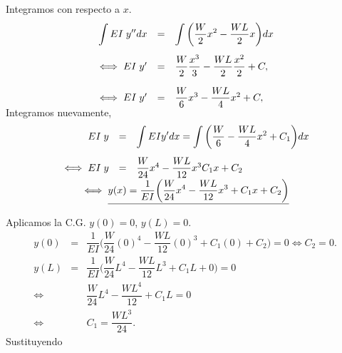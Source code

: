 \documentclass{beamer}
\begin{document}
\begin{frame}[t]
	\vspace{-3mm}
	\begin{exampleblock}{}
		Integramos con respecto a \(x\). \vspace{-3mm}
		\newcommand{\dis}{\displaystyle} %
		\[
			\begin{array}{rcl}
				\dis\int EI\;y'' dx & = & \dis\int \bigg(\dfrac{W}{2} x^2- \dfrac{WL}{2} x\bigg) dx \\[5mm]
				\iff EI\;y' & = & \dfrac{W}{2} \dfrac{x^3}{3} - \dfrac{WL}{2} \dfrac{x^2}{2} +C, \\[5mm]
				\iff EI\;y' & = & \dfrac{W}{6} x^3- \dfrac{WL}{4} x^2+C, \vspace{-3mm}
			\end{array}
		\]
		Integramos nuevamente, \vspace{-3mm}
		\[
			\begin{array}{rcl}
				EI\;y & = & \dis\int EIy' dx = \dis\int \bigg(\dfrac{W}{6} - \dfrac{WL}{4} x^2+C_1\bigg) dx \\[5mm]
				\iff EI\;y & = & \dfrac{W}{24} x^4 - \dfrac{WL}{12} x^3C_1x+C_2 \vspace{-2mm}
			\end{array}
		\]
		\[
			\iff \color{red} \underline{\color{black}  y(x) = \dfrac{1}{EI} \bigg(\dfrac{W}{24} x^4- \dfrac{WL}{12} x^3+C_1x+C_2\bigg)}
		\]
	\end{exampleblock}
\end{frame}

\begin{frame}[t]
	\begin{exampleblock}{}
		Aplicamos la C.G. \(y(0) =0\), \(y(L) =0\).
		\footnotesize 
		\[
			\begin{array}{rcl}
				y(0) & = & \dfrac{1}{EI} \bigg(\dfrac{W}{24} (0) ^4- \dfrac{WL}{12} (0) ^3+C_1(0) +C_2\bigg) =0 \iff C_2 =0. \\[5mm]
				y(L) & = & \dfrac{1}{EI} \bigg(\dfrac{W}{24} L^4- \dfrac{WL}{12} L^3+C_1L+0\bigg) =0 \\[5mm] 
				\iff && \dfrac{W}{24} L^4 - \dfrac{WL^4}{12} +C_1L=0 \\[5mm]
				\iff && C_1 = \dfrac{WL^3}{24}.
			\end{array}
		\]
		Sustituyendo
		\begin{center}
			\color{red} 
		\end{center} 
	\end{exampleblock}
\end{frame}
\end{document}
